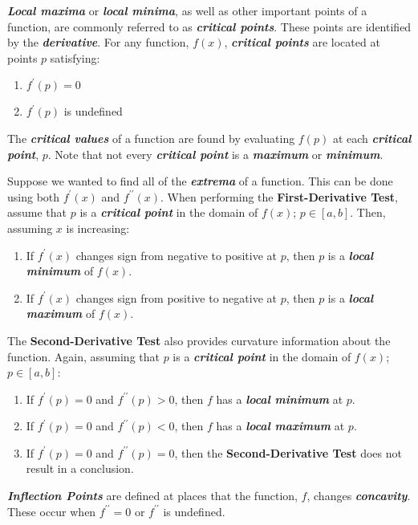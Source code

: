 \vspace{0.1in}
\textbf{\textit{Local maxima}} or \textbf{\textit{local minima}}, as well as other important points of a function, are commonly referred to as \textbf{\textit{critical points}}. These points are identified by the \textbf{\textit{derivative}}. For any function, $f(x)$, \textbf{\textit{critical points}} are located at points $p$ satisfying:
%
\begin{enumerate}
\item $f^\prime(p) = 0$\\
\item $f^\prime(p)$ is undefined
\end{enumerate}
%
The \textbf{\textit{critical values}} of a function are found by evaluating $f(p)$ at each \textbf{\textit{critical point}}, $p$. Note that not every \textbf{\textit{critical point}} is a \textbf{\textit{maximum}} or \textbf{\textit{minimum}}.

\vspace{0.1in}
Suppose we wanted to find all of the \textbf{\textit{extrema}} of a function. This can be done using both $f^\prime(x)$ and $f^{\prime\prime}
(x)$. When performing the \textbf{First-Derivative Test}, assume that $p$ is a \textbf{\textit{critical point}} in the domain of $f(x)$; $p \in [a, b]$. Then, assuming $x$ is increasing:
%
\begin{enumerate}
\item If $f^\prime(x)$ changes sign from negative to positive at $p$, then $p$ is a \textbf{\textit{local minimum}} of $f(x)$.\\
\item If $f^\prime(x)$ changes sign from positive to negative at $p$, then $p$ is a \textbf{\textit{local maximum}} of $f(x)$.
\end{enumerate}
%
The \textbf{Second-Derivative Test} also provides curvature information about the function. Again, assuming that $p$ is a \textbf{\textit{critical point}} in the domain of $f(x)$; $p \in [a, b]$:
%
\begin{enumerate}
\item If $f^\prime(p) = 0$ and $f^{\prime\prime}(p) > 0$, then $f$ has a \textbf{\textit{local minimum}} at $p$.\\
\item If $f^\prime(p) = 0$ and $f^{\prime\prime}(p) < 0$, then $f$ has a \textbf{\textit{local maximum}} at $p$.\\
\item If $f^\prime(p) = 0$ and $f^{\prime\prime}(p) = 0$, then the \textbf{Second-Derivative Test} does not result in a conclusion.
\end{enumerate}
%
\textbf{\textit{Inflection Points}} are defined at places that the function, $f$, changes \textbf{\textit{concavity}}. These occur when $f^{\prime\prime} = 0$ or $f^{\prime\prime}$ is undefined.

